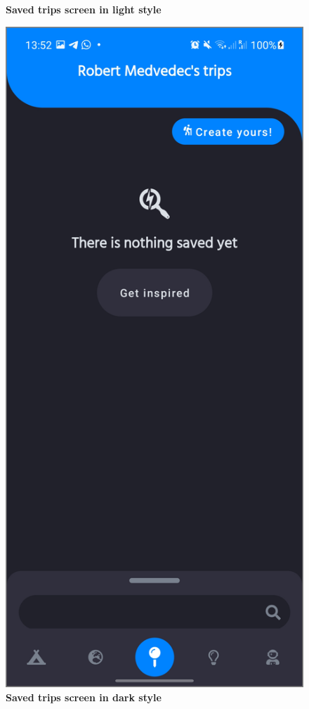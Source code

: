 \begin{figure}[!htb]
\begin{minipage}{.48\textwidth}
\caption{\label{fig:dbapiuser}\textbf{Saved trips screen in light style}}
\end{minipage} 
\begin{minipage}{.48\textwidth}
\centering
\includegraphics[width=.9\textwidth]{../Images/UI/SavedTripsDark.jpg}
\caption{\label{fig:dbapiuser}\textbf{Saved trips screen in dark style}}
\end{minipage}
\end{figure}

